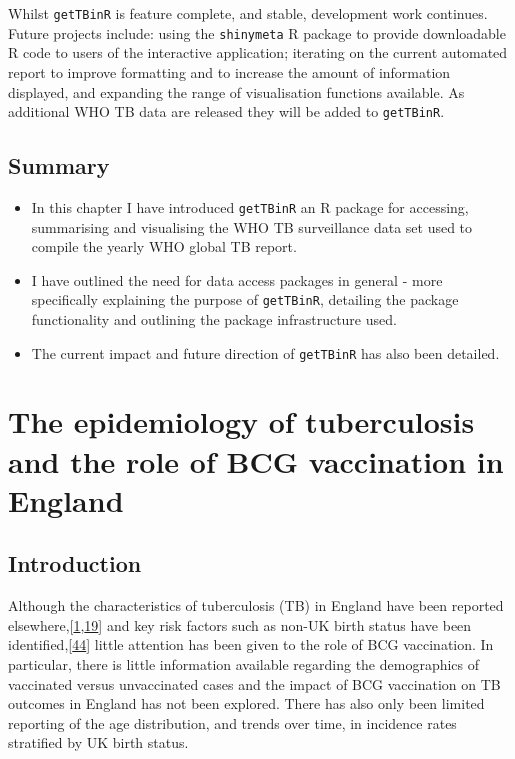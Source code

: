 \documentclass[11pt,twoside]{bristolthesis}
\begin{document}
  Whilst \texttt{getTBinR} is feature complete, and stable, development work continues. Future projects include: using the \texttt{shinymeta} R package to provide downloadable R code to users of the interactive application; iterating on the current automated report to improve formatting and to increase the amount of information displayed, and expanding the range of visualisation functions available. As additional WHO TB data are released they will be added to \texttt{getTBinR}.
  
  \hypertarget{summary-2}{%
  \section{Summary}\label{summary-2}}
  \begin{itemize}
  \item
    In this chapter I have introduced \texttt{getTBinR} an R package for accessing, summarising and visualising the WHO TB surveillance data set used to compile the yearly WHO global TB report.
  \item
    I have outlined the need for data access packages in general - more specifically explaining the purpose of \texttt{getTBinR}, detailing the package functionality and outlining the package infrastructure used.
  \item
    The current impact and future direction of \texttt{getTBinR} has also been detailed.
  \end{itemize}
  \hypertarget{data}{%
  \chapter{The epidemiology of tuberculosis and the role of BCG vaccination in England}\label{data}}
  
  \hypertarget{introduction-2}{%
  \section{Introduction}\label{introduction-2}}
  
  Although the characteristics of tuberculosis (TB) in England have been reported elsewhere,{[}\protect\hyperlink{ref-PHE2017}{1},\protect\hyperlink{ref-PHE2018}{19}{]} and key risk factors such as non-UK birth status have been identified,{[}\protect\hyperlink{ref-French2007}{44}{]} little attention has been given to the role of BCG vaccination. In particular, there is little information available regarding the demographics of vaccinated versus unvaccinated cases and the impact of BCG vaccination on TB outcomes in England has not been explored. There has also only been limited reporting of the age distribution, and trends over time, in incidence rates stratified by UK birth status.
  
\end{document}

